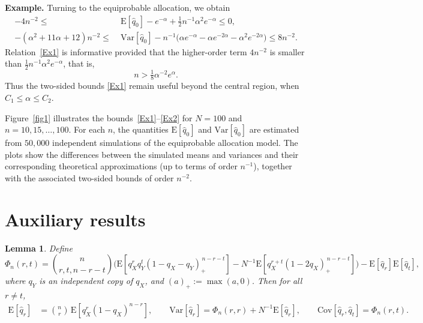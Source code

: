 \documentclass[12]{article}
\newtheorem{lemma}{Lemma} %
\newcommand{\rE}{\mathrm{E}} %
\newcommand{\rV}{\mathrm{Var}} %
\newcommand{\rC}{\mathrm{Cov}} %
\begin{document}
\vspace{2mm}
\noindent\textbf{Example.}
Turning to the equiprobable allocation, we obtain
\begin{align}
-4n^{-2} \le\;& \rE[\hat q_0] - e^{-\alpha} + \tfrac{1}{2}n^{-1}\alpha^2 e^{-\alpha} \le 0, \label{Ex1}\\
-(\alpha^2 + 11\alpha + 12)n^{-2} \le\;& \rV[\hat q_0] - n^{-1}\bigl(\alpha e^{-\alpha} - \alpha e^{-2\alpha} - \alpha^2 e^{-2\alpha}\bigr) \le 8n^{-2}. \label{Ex2}
\end{align}
Relation~\eqref{Ex1} is informative provided that the higher-order term $4n^{-2}$ is smaller than $\tfrac{1}{2}n^{-1}\alpha^2 e^{-\alpha}$, that is,
\[
n > \tfrac{1}{8}\alpha^{-2} e^{\alpha}.
\]
Thus the two-sided bounds \eqref{Ex1}  remain useful beyond the central region, when $C_1 \le \alpha \le C_2$.

Figure~\ref{fig1} illustrates the bounds~\eqref{Ex1}--\eqref{Ex2} for $N = 100$ and $n = 10, 15, \ldots, 100$. For each $n$, the quantities $\rE[\hat q_0]$ and $\rV[\hat q_0]$ are estimated from $50{,}000$ independent simulations of the equiprobable allocation model. The plots show the differences between the simulated means and variances and their corresponding theoretical approximations (up to terms of order $n^{-1}$), together with the associated two-sided bounds of order $n^{-2}$.


\section{Auxiliary results}\label{kl}


\begin{lemma}\label{tm0}
Define
\[\Phi_n(r,t)=\binom{n}{r,t,n-r-t}
\Big(
 \rE\!\left[q_X^r q_Y^t (1-q_X-q_Y)_+^{\,n-r-t}\right]
- N^{-1} \rE\!\left[q_X^{r+t}(1-2q_X)_+^{\,n-r-t}\right]\Big)-\rE[\hat q_r]\rE[\hat q_t],\]
where $q_Y$ is an independent copy of $q_X$, and $(a)_+ := \max(a,0)$. 
Then for all $r \ne t$, 
\begin{align*}
\rE[\hat q_r]
&= \binom{n}{r}\, \rE\!\left[q_X^r (1-q_X)^{n-r}\right],\qquad
\rV[\hat q_r]
= \Phi_n(r,r)+N^{-1}\rE[\hat q_r],\qquad
\rC[\hat q_r ,\hat q_t]= \Phi_n(r,t).
\end{align*}
\end{lemma}
\end{document}
